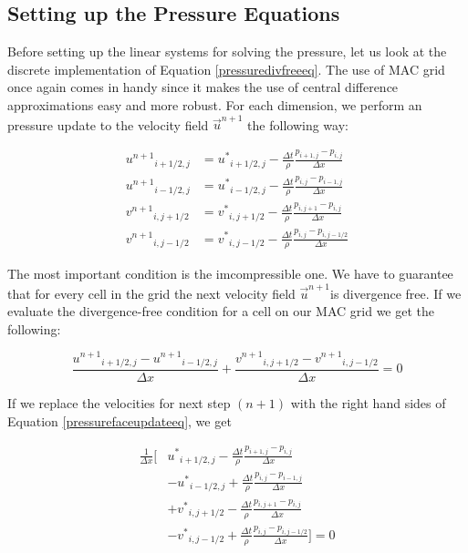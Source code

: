 \subsection{Setting up the Pressure Equations}

Before setting up the linear systems for solving the pressure, let us look at the discrete implementation of Equation \ref {pressuredivfreeeq}. The use of MAC grid once again comes in handy since it makes the use of central difference approximations easy and more robust. For each dimension, we perform an pressure update to the velocity field $\vec{u}^{n+1}$ the following way:

\begin{equation}
\begin{split}
{u^{n+1}}_{i+1/2,j} &= {u^*}_{i+1/2,j} - \frac{\Delta t }{\rho}\frac{p_{i+1,j} - p_{i,j}}{\Delta x} \\
{u^{n+1}}_{i-1/2,j} &= {u^*}_{i-1/2,j} - \frac{\Delta t }{\rho}\frac{p_{i,j} - p_{i-1,j}}{\Delta x} \\
{v^{n+1}}_{i,j+1/2} &= {v^*}_{i,j+1/2} - \frac{\Delta t }{\rho}\frac{p_{i,j+1} - p_{i,j}}{\Delta x} \\
{v^{n+1}}_{i,j-1/2} &= {v^*}_{i,j-1/2} - \frac{\Delta t }{\rho}\frac{p_{i,j} - p_{i,j-1/2}}{\Delta x}
\end{split}
\label{pressurefaceupdateeq}
\end{equation}

The most important condition is the imcompressible one. We have to guarantee that for every cell in the grid the next velocity field $\vec{u}^{n+1}$is divergence free. If we evaluate the divergence-free condition for a cell on our MAC grid we get the following:

\begin{equation}
\frac{{u^{n+1}}_{i+1/2,j} - {u^{n+1}}_{i-1/2,j}}{\Delta x} + \frac{{v^{n+1}}_{i,j+1/2} - {v^{n+1}}_{i,j-1/2}}{\Delta x} = 0
\end{equation}

If we replace the velocities for next step $(n+1)$ with the right hand sides of Equation \ref{pressurefaceupdateeq}, we get

\begin{equation}
\begin{split}
\frac{1}{\Delta x}[ &{u^*}_{i+1/2,j} - \frac{\Delta t }{\rho}\frac{p_{i+1,j} - p_{i,j}}{\Delta x}
\\
& - {u^*}_{i-1/2,j} + \frac{\Delta t }{\rho}\frac{p_{i,j} - p_{i-1,j}}{\Delta x} \\
& + {v^*}_{i,j+1/2} - \frac{\Delta t }{\rho}\frac{p_{i,j+1} - p_{i,j}}{\Delta x} \\
& -{v^*}_{i,j-1/2} + \frac{\Delta t }{\rho}\frac{p_{i,j} - p_{i,j-1/2}}{\Delta x} ] = 0
\end{split}
\label{pressurebeforeeq}
\end{equation}

